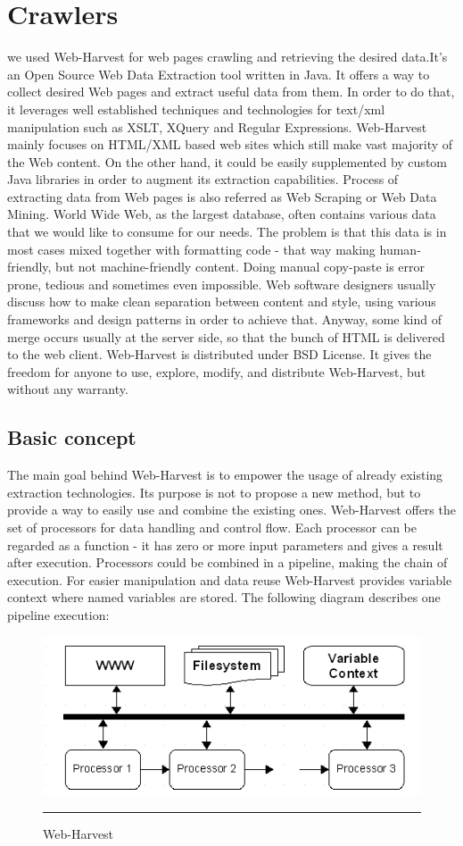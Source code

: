\section{Crawlers}
we used Web-Harvest for web pages crawling and retrieving the desired data.It’s an Open Source Web Data Extraction tool written in Java. It offers a way to collect desired Web pages and extract useful data from them. In order to do that, it leverages well established techniques and technologies for text/xml manipulation such as XSLT, XQuery and Regular Expressions. Web-Harvest mainly focuses on HTML/XML based web sites which still make vast majority of the Web content. On the other hand, it could be easily supplemented by custom Java libraries in order to augment its extraction capabilities.
Process of extracting data from Web pages is also referred as Web Scraping or Web Data Mining. World Wide Web, as the largest database, often contains various data that we would like to consume for our needs. The problem is that this data is in most cases mixed together with formatting code - that way making human-friendly, but not machine-friendly content. Doing manual copy-paste is error prone, tedious and sometimes even impossible. Web software designers usually discuss how to make clean separation between content and style, using various frameworks and design patterns in order to achieve that. Anyway, some kind of merge occurs usually at the server side, so that the bunch of HTML is delivered to the web client.
Web-Harvest is distributed under BSD License. It gives the freedom for anyone to use, explore, modify, and distribute Web-Harvest, but without any warranty. 
\subsection{Basic concept}
The main goal behind Web-Harvest is to empower the usage of already existing extraction technologies. Its purpose is not to propose a new method, but to provide a way to easily use and combine the existing ones. Web-Harvest offers the set of processors for data handling and control flow. Each processor can be regarded as a function - it has zero or more input parameters and gives a result after execution. Processors could be combined in a pipeline, making the chain of execution. For easier manipulation and data reuse Web-Harvest provides variable context where named variables are stored. The following diagram describes one pipeline execution:

\begin{figure}[htbp]
	\centering
		\includegraphics{./Figures/diagram1.png}
		\rule{35em}{0.5pt}
	\caption[Web-Harvest]{Web-Harvest}
\end{figure}


